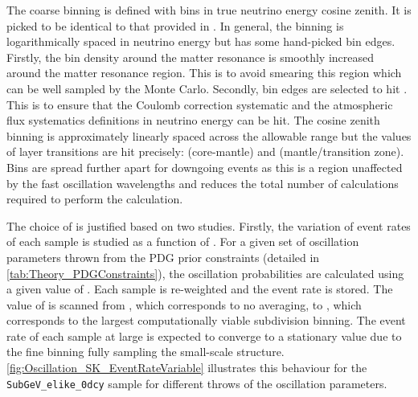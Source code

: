 The coarse binning is defined with  bins in true neutrino energy \quickmath{\times} cosine zenith. It is picked to be identical to that provided in \cite{t2k_tn_425}. In general, the binning is logarithmically spaced in neutrino energy but has some hand-picked bin edges. Firstly, the bin density around the matter resonance is smoothly increased around the matter resonance region. This is to avoid smearing this region which can be well sampled by the Monte Carlo. Secondly, bin edges are selected to hit . This is to ensure that the Coulomb correction systematic and the atmospheric flux systematics definitions in neutrino energy can be hit. The cosine zenith binning is approximately linearly spaced across the allowable range but the values of layer transitions are hit precisely:  (core-mantle) and  (mantle/transition zone). Bins are spread further apart for downgoing events as this is a region unaffected by the fast oscillation wavelengths and reduces the total number of calculations required to perform the calculation.

The choice of  is justified based on two studies. Firstly, the variation of event rates of each sample is studied as a function of . For a given set of oscillation parameters thrown from the PDG prior constraints (detailed in \autoref{tab:Theory_PDGConstraints}), the oscillation probabilities are calculated using a given value of . Each sample is re-weighted and the event rate is stored. The value of  is scanned from , which corresponds to no averaging, to , which corresponds to the largest computationally viable subdivision binning. The event rate of each sample at large  is expected to converge to a stationary value due to the fine binning fully sampling the small-scale structure. \autoref{fig:Oscillation_SK_EventRateVariable} illustrates this behaviour for the \texttt{SubGeV\_elike\_0dcy} sample for  different throws of the oscillation parameters.


